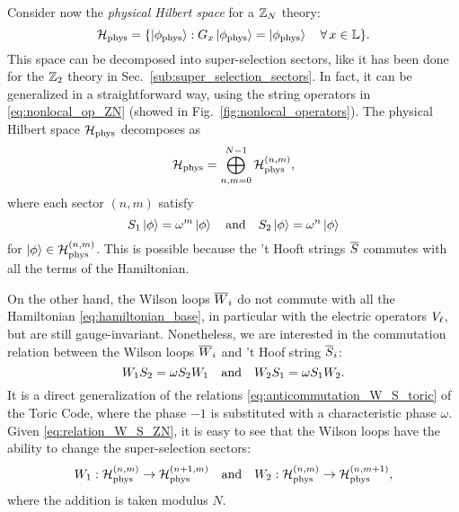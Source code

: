 Consider now the \emph{physical Hilbert space} for a $\mathbb{Z}_N$ theory:
\begin{equation}
    \mathcal{H}_{\text{phys}} = \{ \ket{\phi_{\text{phys}}} : G_x \ket{\phi_{\text{phys}}} = \ket{\phi_{\text{phys}}} \quad \forall \, x \in \mathbb{L} \}.
    \label{eq:decomposizione_Hphys}
\end{equation}
This space can be decomposed into super-selection sectors, like it has been done for the $\mathbb{Z}_2$ theory in Sec.~\ref{sub:super_selection_sectors}.
In fact, it can be generalized in a straightforward way, using the string operators in \eqref{eq:nonlocal_op_ZN} (showed in Fig.~\ref{fig:nonlocal_operators}).
The physical Hilbert space $\mathcal{H}_{\text{phys}}$ decomposes as
\begin{equation}
    \mathcal{H}_{\text{phys}} = \bigoplus_{n,m=0}^{N-1} \mathcal{H}_{\text{phys}}^{(n,m)},
\end{equation}
where each sector $(n,m)$ satisfy
\begin{equation}
    S_1 \ket{\phi} = \omega^{m} \ket{\phi}
    \qand
    S_2 \ket{\phi} = \omega^{n} \ket{\phi}
\end{equation}
for $\ket{\phi} \in \mathcal{H}_{\text{phys}}^{(n,m)}$.
This is possible because the 't Hooft strings $\overline{S}$ commutes with all the terms of the Hamiltonian.

On the other hand, the Wilson loops $\overline{W}_i$ do not commute with all the Hamiltonian \eqref{eq:hamiltonian_base}, in particular with the electric operators $V_{\ell}$, but are still gauge-invariant.
Nonetheless, we are interested in the commutation relation between the Wilson loops $\overline{W}_i$ and 't Hoof string $\overline{S}_i$:
\begin{equation}
    W_1 S_2 = \omega S_2 W_1
    \qand
    W_2 S_1 = \omega S_1 W_2.
    \label{eq:relation_W_S_ZN}
\end{equation}
It is a direct generalization of the relations \eqref{eq:anticommutation_W_S_toric} of the Toric Code, where the phase $-1$ is substituted with a characteristic phase $\omega$.
Given \eqref{eq:relation_W_S_ZN}, it is easy to see that the Wilson loops have the ability to change the super-selection sectors:
\begin{equation}
    W_1 : \Hphys^{(n,m)} \to \Hphys^{(n+1,m)}
    \qand
    W_2 : \Hphys^{(n,m)} \to \Hphys^{(n,m+1)},
    \label{eq:azione_wilson_loop}
\end{equation}
where the addition is taken modulus $N$.

